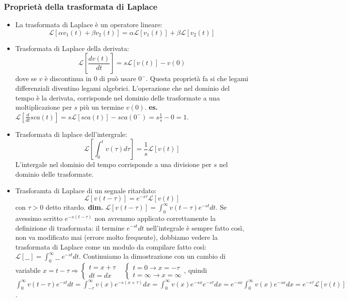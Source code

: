 \subsubsection{Proprietà della trasformata di Laplace}
\begin{itemize}
    \item La trasformata di Laplace è un operatore lineare:
    \[
        \mathcal{L}[\alpha v_1(t) + \beta v_2(t)] = \alpha \mathcal{L}[v_1(t)] + \beta \mathcal{L}[v_2(t)]
    \]
    \item Trasformata di Laplace della derivata: 
    \[
        \mathcal{L}[\frac{dv(t)}{dt}] = s \mathcal{L}[v(t)]-v(0)
    \] dove se $v$ è discontinua in $0$ di può usare $0^-$.\newline
    Questa proprietà fa si che legami differenziali diventino legami algebrici. L'operazione che nel dominio del tempo è la derivata, corrisponde nel dominio delle trasformate a una moltiplicazione per $s$ più un termine $v(0)$.\newline
    \textbf{es.} $\mathcal{L}[\frac{d}{dt}sca(t)] = s \mathcal{L}[sca(t)] - sca(0^-) = s \frac{1}{s}-0 = 1$.
    \item Trasformata di laplace dell'intergrale:
    \[
        \mathcal{L}[\int_{0}^{t}v(\tau)d \tau] = \frac{1}{s} \mathcal{L}[v(t)]
    \]
    L'intergale nel dominio del tempo corrisponde a una divisione per $s$ nel dominio delle trasformate.
    \item Trasforamta di Laplace di un segnale ritardato:
    \[
        \mathcal{L}[v(t-\tau)] = e^{-s \tau} \mathcal{L}[v(t)]
    \] con $\tau > 0$ detto ritardo.\newline
    \textbf{dim.} $\mathcal{L}[v(t-\tau)] = \int_{0}^{\infty}v(t-\tau) e^{-st}dt$. Se avessimo scritto $e^{-s(t-\tau)}$ non avremmo applicato correttamente la definizione di trasformata: il termine $e^{-st}dt$ nell'integrale è sempre fatto così, non va modificato mai (errore molto frequente), dobbiamo vedere la trasformata di Laplace come un modulo da compilare fatto così: $\mathcal{L}[\_\_] = \int_{0}^{\infty}\_\_ \; e^{-st}dt$. Continuiamo la dimostrazione con un cambio di variabile $x = t-\tau \Rightarrow \begin{cases}
        t = x + \tau\\ dt = dx
    \end{cases} \;\;\;\begin{cases}
        t=0 \rightarrow x = - \tau\\ t= \infty \rightarrow  x= \infty
    \end{cases}$, quindi $\int_{0}^{\infty}v(t-\tau) e^{-st}dt = \int_{-\tau}^{\infty} v(x) e^{-s(x+ \tau)}dx = \int_{0}^{\infty}v(x) e^{-sx}e^{-s \tau}dx = e^{-sx}\int_{0}^{\infty}v(x)e^{-sx}dx = e^{-s \tau} \mathcal{L}[v(t)]$.
\end{itemize}